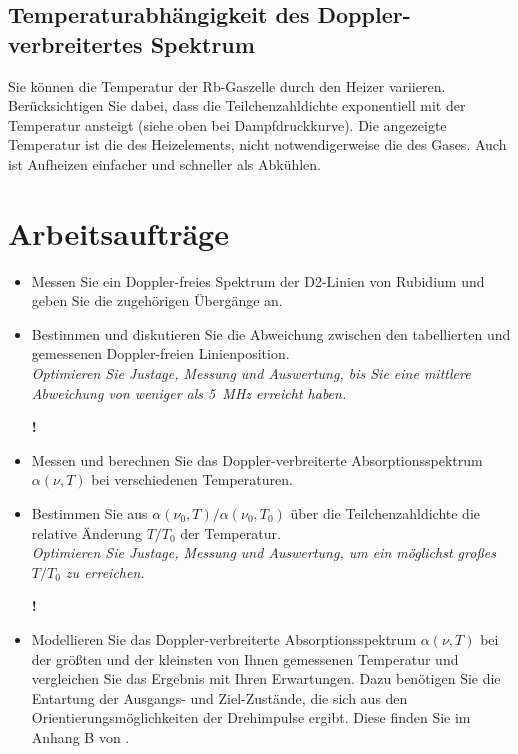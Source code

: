 \subsection{Temperaturabhängigkeit des Doppler-verbreitertes Spektrum}


Sie können die Temperatur der Rb-Gaszelle durch den Heizer variieren. Berücksichtigen Sie dabei, dass die Teilchenzahldichte exponentiell mit der Temperatur ansteigt (siehe oben bei Dampfdruckkurve). Die angezeigte Temperatur ist die des Heizelements, nicht notwendigerweise die des Gases. Auch ist Aufheizen einfacher und schneller als Abkühlen.



\section{Arbeitsaufträge}

\begin{itemize} \setlength{\itemsep}{0pt}
	\item Messen Sie ein Doppler-freies Spektrum der D2-Linien von Rubidium und geben Sie die zugehörigen Übergänge an.
	\item Bestimmen und diskutieren Sie die Abweichung zwischen den tabellierten und gemessenen Doppler-freien Linienposition. \\[1em]
	\emph{Optimieren Sie Justage, Messung und Auswertung, bis Sie eine mittlere Abweichung von weniger als 5~MHz erreicht haben.}\\[1em]
	\begin{marginfigure}[-13mm]{\Huge \textbf{!}}\end{marginfigure}

	\item Messen und berechnen Sie das Doppler-verbreiterte Absorptionsspektrum $\alpha(\nu,T)$ bei verschiedenen Temperaturen.
	\item Bestimmen Sie aus  $\alpha(\nu_0,T) /  \alpha(\nu_0,T_0)$ über die Teilchenzahldichte die relative Änderung $T/T_0$ der Temperatur. \\[1em]
	\emph{Optimieren Sie Justage, Messung und Auswertung, um ein möglichst großes $T/T_0$ zu erreichen.}\\[1em]
	\begin{marginfigure}[-13mm]{\Huge \textbf{!}}\end{marginfigure}
	
	\item Modellieren Sie das Doppler-verbreiterte Absorptionsspektrum $\alpha(\nu,T)$ bei der größten und der kleinsten von Ihnen gemessenen Temperatur und vergleichen Sie das Ergebnis mit Ihren Erwartungen. Dazu benötigen Sie die Entartung der Ausgangs- und Ziel-Zustände, die sich aus den Orientierungsmöglichkeiten der Drehimpulse ergibt. Diese finden Sie im Anhang B von \cite{Siddons2008}.

\end{itemize}



